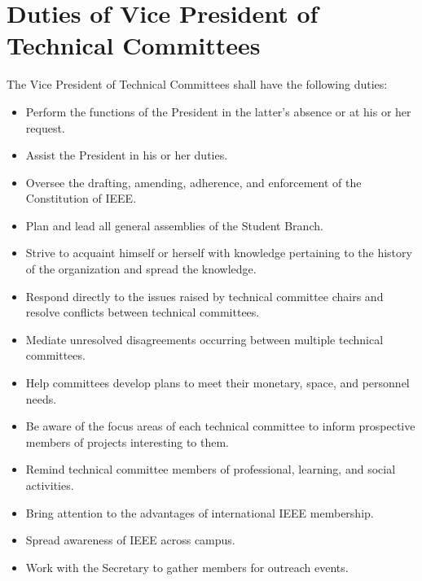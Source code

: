 \documentclass[12pt]{constitution}
\begin{document}
\section{Duties of Vice President of Technical Committees}
\label{sec:officer_vp_Tech}
The Vice President of Technical Committees shall have the following duties:
\begin{itemize}
    \item Perform the functions of the President in the latter's absence or at his or her request.
    \item Assist the President in his or her duties.
    \item Oversee the drafting, amending, adherence, and enforcement of the Constitution of IEEE.
    \item Plan and lead all general assemblies of the Student Branch.
    \item Strive to acquaint himself or herself with knowledge pertaining to the history of the organization and spread the knowledge.
    \item Respond directly to the issues raised by technical committee chairs and resolve conflicts between technical committees.
    \item Mediate unresolved disagreements occurring between multiple technical committees.
    \item Help committees develop plans to meet their monetary, space, and personnel needs.
    \item Be aware of the focus areas of each technical committee to inform prospective members of projects interesting to them.
    \item Remind technical committee members of professional, learning, and social activities.
    \item Bring attention to the advantages of international IEEE membership.
    \item Spread awareness of IEEE across campus.
    \item Work with the Secretary to gather members for outreach events.
\end{itemize}
\end{document}
